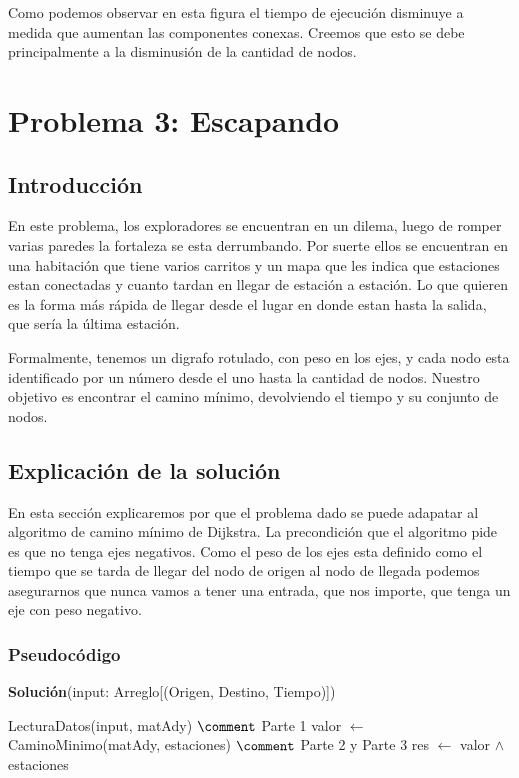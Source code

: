 \documentclass[spanish,12pt]{article}
\begin{document}
Como podemos observar en esta figura el tiempo de ejecución disminuye a medida que aumentan las componentes conexas. Creemos que esto se debe principalmente a la disminusión de la cantidad de nodos.






\section{Problema 3: Escapando}

\subsection{Introducción}

En este problema, los exploradores se encuentran en un dilema, luego de romper varias paredes la fortaleza se esta derrumbando. Por suerte ellos se encuentran en una habitación que tiene varios carritos y un mapa que les indica que estaciones estan conectadas y cuanto tardan en llegar de estación a estación. Lo que quieren es la forma más rápida de llegar desde el lugar en donde estan hasta la salida, que sería la última estación.

Formalmente, tenemos un digrafo rotulado, con peso en los ejes, y cada nodo esta identificado por un número desde el uno hasta la cantidad de nodos. Nuestro objetivo es encontrar el camino mínimo, devolviendo el tiempo y su conjunto de nodos.


\subsection{Explicación de la solución}

   En esta sección explicaremos por que el problema dado se puede adapatar al algoritmo de camino mínimo de Dijkstra.
 La precondición que el algoritmo pide es que no tenga ejes negativos. Como el peso de los ejes esta definido como el tiempo que se tarda de llegar del nodo de origen al nodo de llegada podemos asegurarnos que nunca vamos a tener una entrada, que nos importe, que tenga un eje con peso negativo.

\subsubsection{Pseudocódigo}

\begin{algorithm}[H]{\textbf{Solución}(input: Arreglo[(Origen, Destino, Tiempo)])}
	\begin{algorithmic}[1]
		\State LecturaDatos(input, matAdy) $\comment$ Parte 1
		\State valor $\gets$ CaminoMinimo(matAdy, estaciones) $\comment$ Parte 2 y Parte 3
		\State res $\gets$ valor $\land$ estaciones
	\end{algorithmic}
\end{algorithm}
\end{document}
